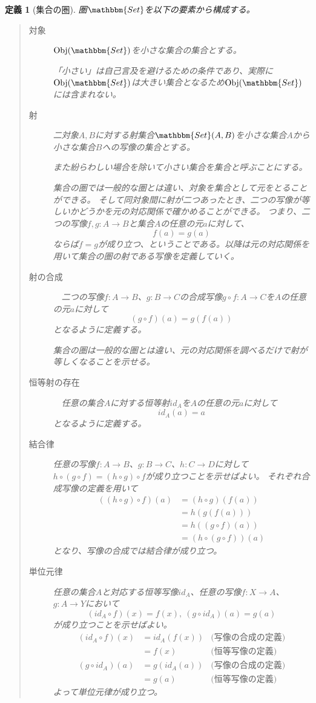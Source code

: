 \documentclass[uplatex,dvipdfmx]{jsarticle}
\newcommand{\cat}[1]{\mathbbm{#1}}
\newcommand{\arrow}{\rightarrow}
\newcommand{\obj}[1]{\mathrm{Obj}(\cat{#1})}
\newcommand{\mor}[3]{#1:#2\arrow #3}
\newcommand{\arset}[3]{\cat{#1}(#2,#3)}
\newtheorem{define}{定義}[section]
\numberwithin{proof}{subsection}
\numberwithin{prop}{subsection}
\numberwithin{define}{subsection}
\begin{document}
	\begin{define}[集合の圏]
		圏$\cat{Set}$を以下の要素から構成する。
		\begin{quote}
			\begin{description}
				\item[対象] $\obj{Set}$を小さな集合の集合とする。

				「小さい」は自己言及を避けるための条件であり、実際に$\obj{Set}$は大きい集合となるため$\obj{Set}$には含まれない。
				\item[射] 二対象$A,B$に対する射集合$\arset{Set}{A}{B}$を小さな集合$A$から小さな集合$B$への写像の集合とする。

				また紛らわしい場合を除いて小さい集合を集合と呼ぶことにする。

				集合の圏では一般的な圏とは違い、対象を集合として元をとることができる。
				そして同対象間に射が二つあったとき、二つの写像が等しいかどうかを元の対応関係で確かめることができる。
				つまり、二つの写像$\mor{f,g}{A}{B}$と集合$A$の任意の元$a$に対して、\[f(a)=g(a)\]ならば$f=g$が成り立つ、ということである。以降は元の対応関係を用いて集合の圏の射である写像を定義していく。

				\item[射の合成] 　二つの写像$\mor{f}{A}{B}$、$\mor{g}{B}{C}$の合成写像$\mor{g\circ f}{A}{C}$を$A$の任意の元$a$に対して\[(g\circ f)(a)=g(f(a))\]となるように定義する。

				集合の圏は一般的な圏とは違い、元の対応関係を調べるだけで射が等しくなることを示せる。
				\item[恒等射の存在]　任意の集合$A$に対する恒等射$id_A$を$A$の任意の元$a$に対して\[id_A(a)=a\]となるように定義する。
				\item[結合律] 任意の写像$\mor{f}{A}{B}$、$\mor{g}{B}{C}$、$\mor{h}{C}{D}$に対して$h\circ(g\circ f)=(h\circ g)\circ f$が成り立つことを示せばよい。
				それぞれ合成写像の定義を用いて
				\begin{align*}
					((h\circ g)\circ f)(a)&=(h\circ g)(f(a))\\
					&=h(g(f(a)))\\
					&=h((g\circ f)(a))\\
					&=(h\circ(g\circ f))(a)
				\end{align*}
				となり、写像の合成では結合律が成り立つ。
				\item[単位元律] 任意の集合$A$と対応する恒等写像$id_A$、任意の写像$\mor{f}{X}{A}$、$\mor{g}{A}{Y}$において\[(id_A\circ f)(x)=f(x),\ (g\circ id_A)(a)=g(a)\]が成り立つことを示せばよい。
				\begin{align*}
					(id_A\circ f)(x)&=id_A(f(x))&\text{(写像の合成の定義)}\\
					&=f(x)&\text{{(恒等写像の定義)}}\\
					(g\circ id_A)(a)&=g(id_A(a))&\text{(写像の合成の定義)}\\
					&=g(a)&\text{{(恒等写像の定義)}}
				\end{align*}
				よって単位元律が成り立つ。
			\end{description}
		\end{quote}
	\end{define}
	
\end{document}
